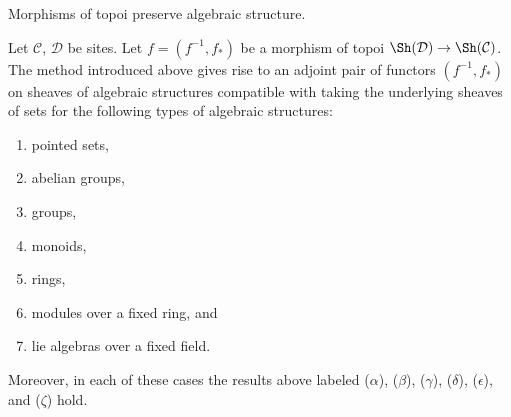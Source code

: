 \begin{proposition}
\label{proposition-functoriality-algebraic-structures-topoi}
\begin{slogan}
Morphisms of topoi preserve algebraic structure.
\end{slogan}
Let $\mathcal{C}$, $\mathcal{D}$ be sites.
Let $f = (f^{-1}, f_*)$ be a morphism of topoi
$\Sh(\mathcal{D}) \to \Sh(\mathcal{C})$.
The method introduced above gives rise to an adjoint
pair of functors $(f^{-1}, f_*)$ on sheaves of algebraic structures
compatible with taking the underlying sheaves of sets
for the following types of algebraic structures:
\begin{enumerate}
\item pointed sets,
\item abelian groups,
\item groups,
\item monoids,
\item rings,
\item modules over a fixed ring, and
\item lie algebras over a fixed field.
\end{enumerate}
Moreover, in each of these cases the results above labeled ($\alpha$),
($\beta$), ($\gamma$), ($\delta$), ($\epsilon$), and ($\zeta$) hold.
\end{proposition}

